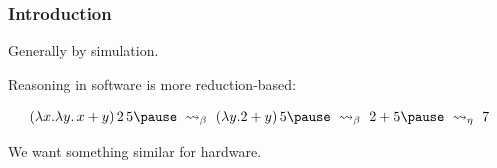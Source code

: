 \begin{frame}
    \frametitle{Introduction}

    Generally by \alert{simulation}.

    \pause

    Reasoning in \alert{software} is more \alert{reduction-based}:

    \[
        (\lambda x.\lambda y.\, x + y) \, 2 \, 5 
        \pause\
        \rightsquigarrow_{\beta}
        \
        (\lambda y. 2 + y) \, 5 
        \pause\
        \rightsquigarrow_{\beta}
        \
        2 + 5 
        \pause\
        \rightsquigarrow_{\eta}
        \
        7
    \]

    We want something similar for hardware.
\end{frame}

\begin{frame}
    \frametitle{}

    

\end{frame}